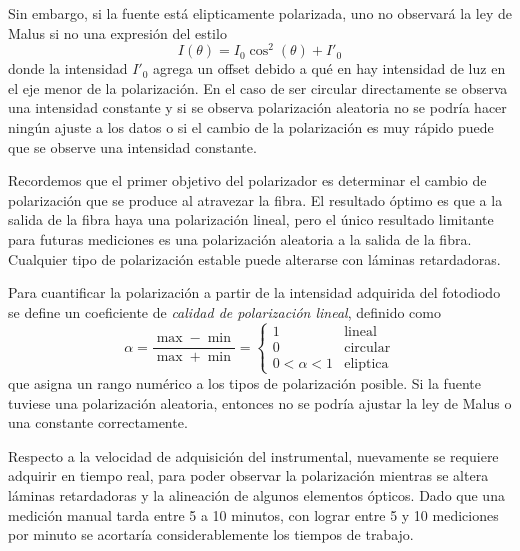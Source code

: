 Sin embargo, si la fuente está elipticamente polarizada, uno no observará la ley de Malus si no una expresión del estilo \cite{goldstein_collett}
\begin{equation}
    I(\theta) = I_0 \cos^2(\theta) + I'_0
\end{equation}
donde la intensidad $I'_0$ agrega un offset debido a qué en hay intensidad de luz en el eje menor de la polarización. En el caso de ser circular directamente se observa una intensidad constante y si se observa polarización aleatoria no se podría hacer ningún ajuste a los datos o si el cambio de la polarización es muy rápido puede que se observe una intensidad constante.

Recordemos que el primer objetivo del polarizador es determinar el cambio de polarización que se produce al atravezar la fibra. El resultado óptimo es que a la salida de la fibra haya una polarización lineal, pero el único resultado limitante para futuras mediciones es una polarización aleatoria a la salida de la fibra. Cualquier tipo de polarización estable puede alterarse con láminas retardadoras. 

Para cuantificar la polarización a partir de la intensidad adquirida del fotodiodo se define un coeficiente de \emph{calidad de polarización lineal}, definido como
\begin{equation}
    \alpha = \frac{\max - \min}{\max + \min} = \begin{cases} 1 & \text{lineal} \\ 0 & \text{circular} \\ 0 < \alpha < 1 & \text{eliptica} \end{cases}
    \label{eq:polarizacion/alpha}
\end{equation}
que asigna un rango numérico a los tipos de polarización posible. Si la fuente tuviese una polarización aleatoria, entonces no se podría ajustar la ley de Malus o una constante correctamente.

Respecto a la velocidad de adquisición del instrumental, nuevamente se requiere adquirir en tiempo real, para poder observar la polarización mientras se altera láminas retardadoras y la alineación de algunos elementos ópticos. Dado que una medición manual tarda entre 5 a 10 minutos, con lograr entre 5 y 10 mediciones por minuto se acortaría considerablemente los tiempos de trabajo.
